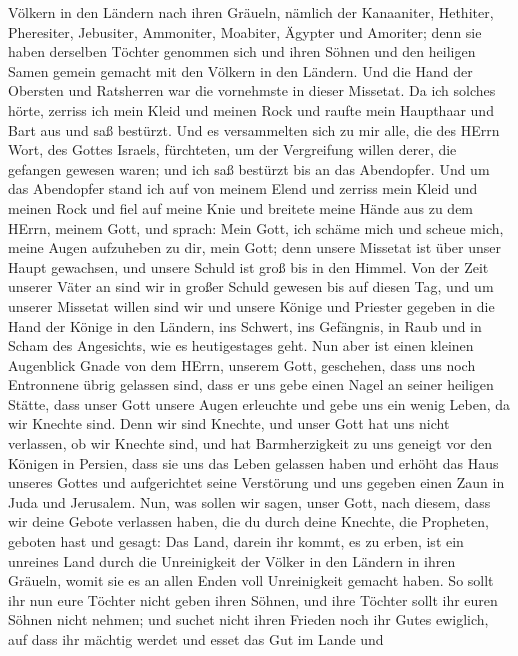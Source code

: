 Völkern in den Ländern nach ihren Gräueln, nämlich der Kanaaniter,
Hethiter, Pheresiter, Jebusiter, Ammoniter, Moabiter, Ägypter und
Amoriter;  denn sie haben derselben Töchter genommen sich
und ihren Söhnen und den heiligen Samen gemein gemacht mit den Völkern
in den Ländern. Und die Hand der Obersten und Ratsherren war die
vornehmste in dieser Missetat.  Da ich solches hörte,
zerriss ich mein Kleid und meinen Rock und raufte mein Haupthaar und
Bart aus und saß bestürzt.  Und es versammelten sich zu mir
alle, die des HErrn Wort, des Gottes Israels, fürchteten, um der
Vergreifung willen derer, die gefangen gewesen waren; und ich saß
bestürzt bis an das Abendopfer.  Und um das Abendopfer stand
ich auf von meinem Elend und zerriss mein Kleid und meinen Rock und fiel
auf meine Knie und breitete meine Hände aus zu dem HErrn, meinem Gott,
 und sprach: Mein Gott, ich schäme mich und scheue mich,
meine Augen aufzuheben zu dir, mein Gott; denn unsere Missetat ist über
unser Haupt gewachsen, und unsere Schuld ist groß bis in den Himmel.
 Von der Zeit unserer Väter an sind wir in großer Schuld
gewesen bis auf diesen Tag, und um unserer Missetat willen sind wir und
unsere Könige und Priester gegeben in die Hand der Könige in den
Ländern, ins Schwert, ins Gefängnis, in Raub und in Scham des
Angesichts, wie es heutigestages geht.  Nun aber ist einen
kleinen Augenblick Gnade von dem HErrn, unserem Gott, geschehen, dass
uns noch Entronnene übrig gelassen sind, dass er uns gebe einen Nagel an
seiner heiligen Stätte, dass unser Gott unsere Augen erleuchte und gebe
uns ein wenig Leben, da wir Knechte sind.  Denn wir sind
Knechte, und unser Gott hat uns nicht verlassen, ob wir Knechte sind,
und hat Barmherzigkeit zu uns geneigt vor den Königen in Persien, dass
sie uns das Leben gelassen haben und erhöht das Haus unseres Gottes und
aufgerichtet seine Verstörung und uns gegeben einen Zaun in Juda und
Jerusalem.  Nun, was sollen wir sagen, unser Gott, nach
diesem, dass wir deine Gebote verlassen haben,  die du
durch deine Knechte, die Propheten, geboten hast und gesagt: Das Land,
darein ihr kommt, es zu erben, ist ein unreines Land durch die
Unreinigkeit der Völker in den Ländern in ihren Gräueln, womit sie es an
allen Enden voll Unreinigkeit gemacht haben.  So sollt ihr
nun eure Töchter nicht geben ihren Söhnen, und ihre Töchter sollt ihr
euren Söhnen nicht nehmen; und suchet nicht ihren Frieden noch ihr Gutes
ewiglich, auf dass ihr mächtig werdet und esset das Gut im Lande und
